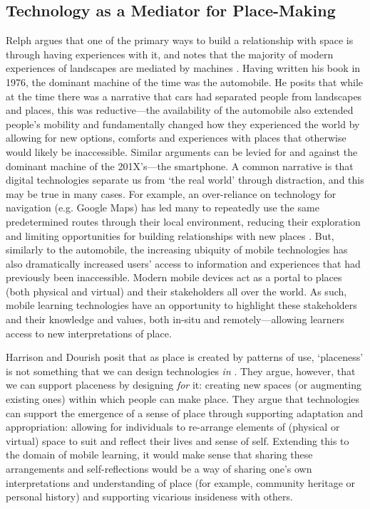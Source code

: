 \subsection{Technology as a Mediator for Place-Making}
\label{sec:TechMediator}
Relph argues that one of the primary ways to build a relationship with space is through having experiences with it, and notes that the majority of modern experiences of landscapes are mediated by machines \citep{Relph1976}. Having written his book in 1976, the dominant machine of the time was the automobile. He posits that while at the time there was a narrative that cars had separated people from landscapes and places, this was reductive---the availability of the automobile also extended people's mobility and fundamentally changed how they experienced the world by allowing for new options, comforts and experiences with places that otherwise would likely be inaccessible. Similar arguments can be levied for and against the dominant machine of the 201X's---the smartphone. A common narrative is that digital technologies separate us from `the real world' through distraction, and this may be true in many cases. For example, an over-reliance on technology for navigation (e.g. Google Maps) has led many to repeatedly use the same predetermined routes through their local environment, reducing their exploration and limiting opportunities for building relationships with new places \citep{Lochtefeld2019}. But, similarly to the automobile, the increasing ubiquity of mobile technologies has also dramatically increased users' access to information and experiences that had previously been inaccessible. Modern mobile devices act as a portal to places (both physical and virtual) and their stakeholders all over the world. As such, mobile learning technologies have an opportunity to highlight these stakeholders and their knowledge and values, both in-situ and remotely---allowing learners access to new interpretations of place.

Harrison and Dourish posit that as place is created by patterns of use, `placeness' is not something that we can design technologies \textit{in} \citep{harrison1996}. They argue, however, that we can support placeness by designing \textit{for} it: creating new spaces (or augmenting existing ones) within which people can make place. They argue that technologies can support the emergence of a sense of place through supporting adaptation and appropriation: allowing for individuals to re-arrange elements of (physical or virtual) space to suit and reflect their lives and sense of self. Extending this to the domain of mobile learning, it would make sense that sharing these arrangements and self-reflections would be a way of sharing one's own interpretations and understanding of place (for example, community heritage or personal history) and supporting vicarious insideness with others.

